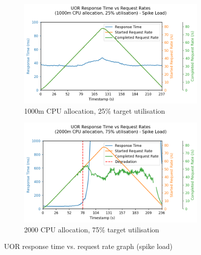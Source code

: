 \begin{figure}[h]
    \centering
    \begin{subfigure}{.5\textwidth}
      \centering
      \includegraphics[width=\linewidth]{figures/uor-rau-i5-spike-rt-graph.png}
      \caption{1000m CPU allocation, 25\% target utilisation}
    \end{subfigure}%
    \begin{subfigure}{.5\textwidth}
      \centering
      \includegraphics[width=\linewidth]{figures/uor-rau-i11-spike-rt-graph.png}
      \caption{2000 CPU allocation, 75\% target utilisation}
    \end{subfigure}

    \caption{UOR response time vs. request rate graph (spike load)}
    \label{figure:uor-resource-allocation-rt-graph-i5-i11-spike}
\end{figure}

